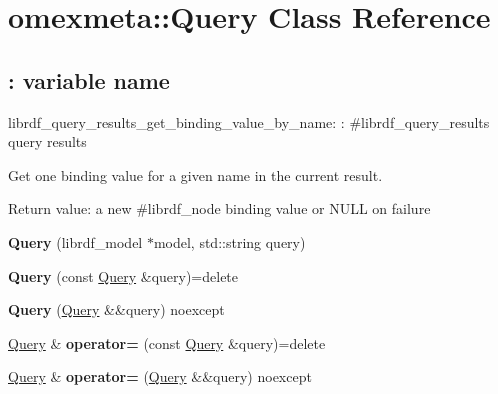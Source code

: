 \hypertarget{classomexmeta_1_1Query}{}\section{omexmeta\+:\+:Query Class Reference}
\label{classomexmeta_1_1Query}
\subsection*{\+: variable name}
\label{_amgrp7ca1d8b10bb02d408ac42bd6ecaaf12b}%
librdf\+\_\+query\+\_\+results\+\_\+get\+\_\+binding\+\_\+value\+\_\+by\+\_\+name\+: \+: \#librdf\+\_\+query\+\_\+results query results

Get one binding value for a given name in the current result.

Return value\+: a new \#librdf\+\_\+node binding value or N\+U\+LL on failure \begin{DoxyCompactItemize}
\item 
\mbox{\label{classomexmeta_1_1Query_a405a2bcace57e7b9a78b42ff0bb04a27}} 
{\bfseries Query} (librdf\+\_\+model $\ast$model, std\+::string query)
\item 
\mbox{\label{classomexmeta_1_1Query_a3f9ff18a0ed6a389104ca76d41119739}} 
{\bfseries Query} (const \hyperlink{classomexmeta_1_1Query}{Query} \&query)=delete
\item 
\mbox{\label{classomexmeta_1_1Query_a6162664ef9a36b453a3b96e913356996}} 
{\bfseries Query} (\hyperlink{classomexmeta_1_1Query}{Query} \&\&query) noexcept
\item 
\mbox{\label{classomexmeta_1_1Query_afd53f231969232188218cae148aa6482}} 
\hyperlink{classomexmeta_1_1Query}{Query} \& {\bfseries operator=} (const \hyperlink{classomexmeta_1_1Query}{Query} \&query)=delete
\item 
\mbox{\label{classomexmeta_1_1Query_a818772558b490e25b2ee1bc2417e1282}} 
\hyperlink{classomexmeta_1_1Query}{Query} \& {\bfseries operator=} (\hyperlink{classomexmeta_1_1Query}{Query} \&\&query) noexcept
\item 
\mbox{\label{classomexmeta_1_1Query_a0b9e4ef7fb6c3d0e79a51ed327639ac0}} 

\end{DoxyCompactItemize}
